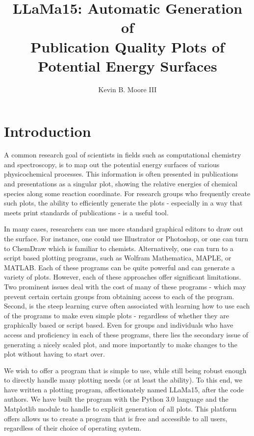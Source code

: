 \documentclass{article}
\begin{document}
\title{LLaMa15: Automatic Generation of \\ Publication Quality Plots of Potential Energy Surfaces}
\author{Kevin B. Moore III}
\maketitle

\section{Introduction}

A common research goal of scientists in fields such as computational chemistry and spectroscopy, is to map out the potential energy surfaces of various physicochemical processes. This information is often presented in publications and presentations as a singular plot, showing the relative energies of chemical species along some reaction coordinate. For research groups who frequently create such plots, the ability to efficiently generate the plots - especially in a way that meets print standards of publications - is a useful tool.

In many cases, researchers can use more standard graphical editors to draw out the surface. For instance, one could use Illustrator or Photoshop, or one can turn to ChemDraw which is familiar to chemists. Alternatively, one can turn to a script based plotting programs, such as Wolfram Mathematica, MAPLE, or MATLAB. Each of these programs can be quite powerful and can generate a variety of plots. However, each of these approaches offer significant limitations. Two prominent issues deal with the cost of many of these programs - which may prevent certain certain groups from obtaining access to each of the program. Second, is the steep learning curve often associated with learning how to use each of the programs to make even simple plots - regardless of whether they are graphically based or script based. Even for groups and individuals who have access and proficiency in each of these programs, there lies the secondary issue of generating a nicely scaled plot, and more importantly to make changes to the plot without having to start over.

We wish to offer a program that is simple to use, while still being robust enough to directly handle many plotting needs (or at least the ability). To this end, we have written a plotting program, affectionately named LLaMa15, after the code authors. We have built the program with the Python 3.0 language and the Matplotlib module to handle to explicit generation of all plots. This platform offers allows us to create a program that is free and accessible to all users, regardless of their choice of operating system. 
\end{document}
